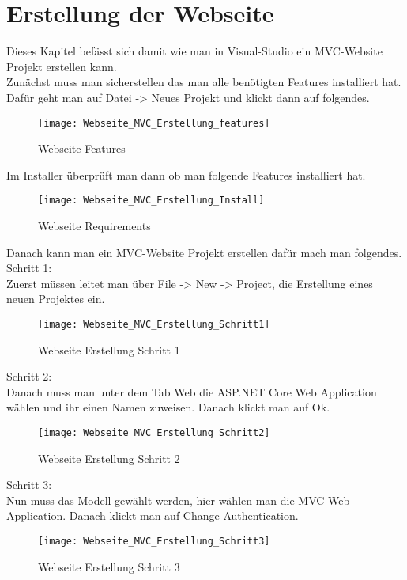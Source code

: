 {\section{Erstellung der Webseite}
\label{sec:erstellung_ws}
Dieses Kapitel befässt sich damit wie man in Visual-Studio ein MVC-Website Projekt erstellen kann.\\
Zunächst muss man sicherstellen das man alle benötigten Features installiert hat. Dafür geht man auf Datei -> Neues Projekt und klickt dann auf folgendes.\\
\begin{figure}[H]
    \texttt{[image: Webseite\_MVC\_Erstellung\_features]}
    \caption{Webseite Features}
    \label{fig:webfeatures}
\end{figure}
Im Installer überprüft man dann ob man folgende Features installiert hat.\\
\begin{figure}[H]
    \texttt{[image: Webseite\_MVC\_Erstellung\_Install]}
    \caption{Webseite Requirements}
    \label{fig:webinstall}
\end{figure}
Danach kann man ein MVC-Website Projekt erstellen dafür mach man folgendes.\\
Schritt 1:\\
Zuerst müssen leitet man über File -> New -> Project, die Erstellung eines neuen Projektes ein.\\
\begin{figure}[H]
    \texttt{[image: Webseite\_MVC\_Erstellung\_Schritt1]}
    \caption{Webseite Erstellung Schritt 1}
    \label{fig:weberstell1}
\end{figure}
Schritt 2:\\
Danach muss man unter dem Tab Web die ASP.NET Core Web Application wählen und ihr einen Namen zuweisen. Danach klickt man auf Ok.\\
\begin{figure}[H]
    \texttt{[image: Webseite\_MVC\_Erstellung\_Schritt2]}
    \caption{Webseite Erstellung Schritt 2}
    \label{fig:weberstell2}
\end{figure}
Schritt 3:\\
Nun muss das Modell gewählt werden, hier wählen man die MVC Web-Application. Danach klickt man auf Change Authentication. \\
\begin{figure}[H]
    \texttt{[image: Webseite\_MVC\_Erstellung\_Schritt3]}
    \caption{Webseite Erstellung Schritt 3}

\end{figure}}

